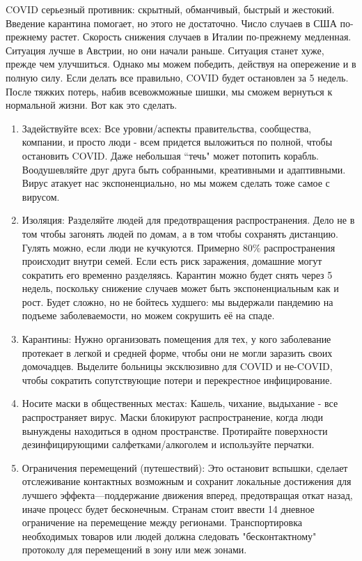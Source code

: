 \documentclass[onecolumn,journal]{IEEEtran}
\begin{document}
\begin{multicols}{2}
COVID серьезный противник: скрытный, обманчивый, быстрый и жестокий. Введение карантина помогает, но этого не достаточно. Число случаев в США по-прежнему растет. Скорость снижения случаев в Италии по-прежнему медленная. Ситуация лучше в Австрии, но они начали раньше. Ситуация станет хуже, прежде чем улучшиться. Однако мы можем победить, действуя на опережение и в полную силу. Если делать все правильно, COVID будет остановлен за 5 недель. После тяжких потерь, набив всевожможные шишки, мы сможем вернуться к нормальной жизни. Вот как это сделать.

\begin{enumerate}
\item Задействуйте всех: Все уровни/аспекты правительства, сообщества, компании, и просто люди - всем придется выложиться по полной, чтобы остановить COVID. Даже небольшая ``течь" может потопить корабль. Воодушевляйте друг друга быть собранными, креативными и адаптивными. Вирус атакует нас экспоненциально, но мы можем сделать тоже самое с вирусом.
\item Изоляция: Разделяйте людей для предотвращения распространения. Дело не в том чтобы загонять людей по домам, а в том чтобы сохранять дистанцию. Гулять можно, если люди не кучкуются. Примерно 80\% распространения происходит внутри семей. Если есть риск заражения, домашние могут сократить его временно разделяясь. Карантин можно будет снять через 5 недель, поскольку снижение случаев может быть экспоненциальным как и рост. Будет сложно, но не бойтесь худшего: мы выдержали пандемию на подъеме заболеваемости, но можем сокрушить её на спаде.
\item Карантины: Нужно организовать помещения для тех, у кого заболевание протекает в легкой и средней форме, чтобы они не могли заразить своих домочадцев. Выделите больницы эксклюзивно для COVID и не-COVID, чтобы сократить сопутствующие потери и перекрестное инфицирование.
\item Носите маски в общественных местах: Кашель, чихание, выдыхание - все распространяет вирус. Маски блокируют распространение, когда люди вынуждены находиться в одном пространстве. Протирайте поверхности дезинфицирующими салфетками/алкоголем и используйте перчатки.
\item Ограничения перемещений (путешествий): Это остановит вспышки, сделает отслеживание контактных возможным и сохранит локальные достижения для лучшего эффекта---поддержание движения вперед, предотвращая откат назад, иначе процесс будет бесконечным. Странам стоит ввести 14 дневное ограничение на перемещение между регионами. Транспортировка необходимых товаров или людей должна следовать "бесконтактному" протоколу для перемещений в зону или меж зонами.

\end{enumerate}
\end{multicols}
\end{document}
